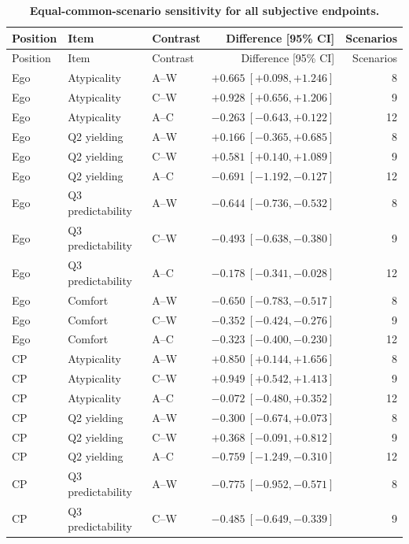 \begingroup\scriptsize
\setlength{\tabcolsep}{4pt}
\renewcommand{\arraystretch}{1.1}
\begin{longtable}{lllrr}
\caption{\textbf{Equal-common-scenario sensitivity for all subjective endpoints.}}\label{tab:subjective_scenarios}\\
\toprule
Position & Item & Contrast & Difference [95\% CI] & Scenarios \\
\midrule
\endfirsthead
\toprule
Position & Item & Contrast & Difference [95\% CI] & Scenarios \\
\midrule
\endhead
\bottomrule
\endfoot
Ego & Atypicality & A--W & $+0.665\ [+0.098,+1.246]$ & 8 \\
Ego & Atypicality & C--W & $+0.928\ [+0.656,+1.206]$ & 9 \\
Ego & Atypicality & A--C & $-0.263\ [-0.643,+0.122]$ & 12 \\
Ego & Q2 yielding & A--W & $+0.166\ [-0.365,+0.685]$ & 8 \\
Ego & Q2 yielding & C--W & $+0.581\ [+0.140,+1.089]$ & 9 \\
Ego & Q2 yielding & A--C & $-0.691\ [-1.192,-0.127]$ & 12 \\
Ego & Q3 predictability & A--W & $-0.644\ [-0.736,-0.532]$ & 8 \\
Ego & Q3 predictability & C--W & $-0.493\ [-0.638,-0.380]$ & 9 \\
Ego & Q3 predictability & A--C & $-0.178\ [-0.341,-0.028]$ & 12 \\
Ego & Comfort & A--W & $-0.650\ [-0.783,-0.517]$ & 8 \\
Ego & Comfort & C--W & $-0.352\ [-0.424,-0.276]$ & 9 \\
Ego & Comfort & A--C & $-0.323\ [-0.400,-0.230]$ & 12 \\
CP & Atypicality & A--W & $+0.850\ [+0.144,+1.656]$ & 8 \\
CP & Atypicality & C--W & $+0.949\ [+0.542,+1.413]$ & 9 \\
CP & Atypicality & A--C & $-0.072\ [-0.480,+0.352]$ & 12 \\
CP & Q2 yielding & A--W & $-0.300\ [-0.674,+0.073]$ & 8 \\
CP & Q2 yielding & C--W & $+0.368\ [-0.091,+0.812]$ & 9 \\
CP & Q2 yielding & A--C & $-0.759\ [-1.249,-0.310]$ & 12 \\
CP & Q3 predictability & A--W & $-0.775\ [-0.952,-0.571]$ & 8 \\
CP & Q3 predictability & C--W & $-0.485\ [-0.649,-0.339]$ & 9 \\

\end{longtable}
